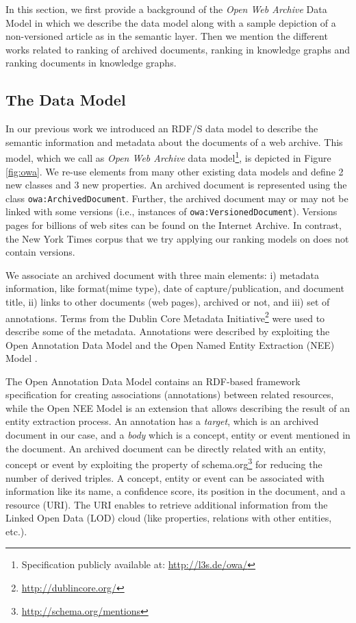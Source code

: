 


In this section, we first provide a background of the
{\em Open Web Archive} Data Model in which we describe the data model
along with a sample depiction of a non-versioned article as
in the semantic layer.
Then we mention the different works related to ranking of archived documents,
ranking in knowledge graphs and
ranking documents in knowledge graphs.

\subsection{The  Data Model}
\label{subsec:semanticmodel}

\-\hspace{0.5cm}In our previous work\cite{fafalios2017SemLayer} we introduced an RDF/S data model to describe
the semantic information and metadata about the documents
of a web archive.
This model, which we call as {\em Open Web Archive} data model\footnote{Specification publicly
available at: \url{http://l3s.de/owa/}},
is depicted in Figure \ref{fig:owa}.
We re-use elements from many other existing data models
and define 2 new classes and 3 new properties.
An archived document is represented using the class {\tt owa:Archi\-ved\-Do\-cu\-ment}.
Further, the archived document may or may not be linked with some versions
(i.e., instances of {\tt owa:Ve\-rsio\-ned\-Do\-cu\-ment}).
Versions pages for billions of web sites can be
found on the Internet Archive.
In contrast, the New York Times corpus \cite{sandhaus2008new} that we
try applying our ranking models on does
not contain versions.

We associate an archived document
with three main elements:
i) metadata information, like format(mime type),
date of capture/publication, and document title,
ii) links to other documents (web pages), archived or not, and
iii) set of annotations.
Terms from the Dublin Core Metadata Initiative\footnote{\url{http://dublincore.org/}}
were used to describe some of the metadata.
Annotations were described by exploiting
the Open Annotation Data Model \cite{sanderson2013open}
and the Open Named Entity Extraction (NEE) Model \cite{fafalios2015ijait}. %

The Open Annotation Data Model contains an RDF-based framework specification for creating associations (annotations)
between related resources, while the Open NEE Model is an extension
that allows describing the result of an entity extraction process.
An annotation has a {\em target}, which is an archived document in our case, and
a {\em body} which is a concept, entity or event
mentioned in the document.
An archived document can be directly related with an
entity, concept or event by exploiting the property 
of schema.org\footnote{\url{http://schema.org/mentions}} for reducing the
number of derived triples.
A concept, entity or event can be associated with information like
its name, a confidence score, its position in the document, and a resource (URI).
The URI enables to retrieve additional information from the Linked Open Data (LOD)
cloud \cite{heath2011linked} (like properties, relations with other entities, etc.).

